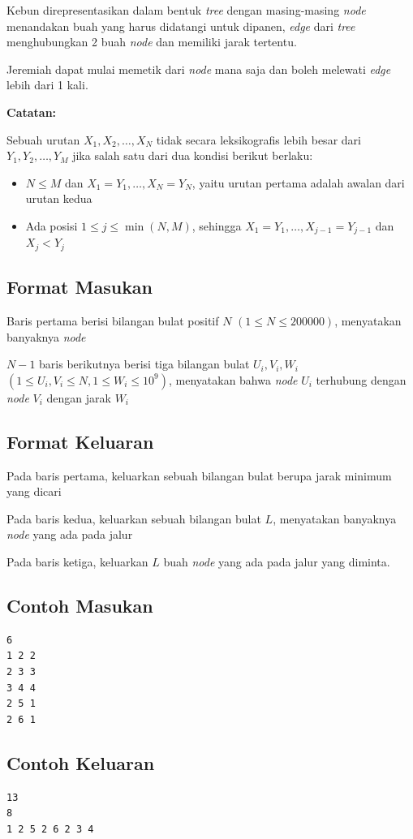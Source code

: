 \documentclass{article}
\begin{document}
Kebun direpresentasikan dalam bentuk \textit{tree} dengan masing-masing \textit{node} menandakan buah yang harus didatangi untuk dipanen, \textit{edge} dari \textit{tree} menghubungkan 2 buah \textit{node} dan memiliki jarak tertentu.

Jeremiah dapat mulai memetik dari \textit{node} mana saja dan boleh melewati \textit{edge} lebih dari 1 kali.

\textbf{Catatan:}

Sebuah urutan $X_1, X_2, \dots, X_N$ tidak secara leksikografis lebih besar dari $Y_1, Y_2, \dots, Y_M$ jika salah satu dari dua kondisi berikut berlaku:

\begin{itemize}
\item $N \leq M$ dan $X_1 = Y_1, \dots, X_N = Y_N$, yaitu urutan pertama adalah awalan dari urutan kedua

\item Ada posisi $1 \leq j \leq \min(N, M)$, sehingga $X_1 = Y_1, \dots, X_{j-1} = Y_{j-1}$ dan $X_j<Y_j$
\end{itemize}

\subsection*{Format Masukan}
Baris pertama berisi bilangan bulat positif $N$ $(1 \leq N \leq 200000)$, menyatakan banyaknya \textit{node}

$N-1$ baris berikutnya berisi tiga bilangan bulat $U_i, V_i, W_i$ $(1 \leq U_i, V_i \leq N, 1 \leq W_i \leq 10^9)$, menyatakan bahwa \textit{node} $U_i$ terhubung dengan \textit{node} $V_i$ dengan jarak $W_i$

\subsection*{Format Keluaran}
Pada baris pertama, keluarkan sebuah bilangan bulat berupa jarak minimum yang dicari

Pada baris kedua, keluarkan sebuah bilangan bulat $L$, menyatakan banyaknya \textit{node} yang ada pada jalur

Pada baris ketiga, keluarkan $L$ buah \textit{node} yang ada pada jalur yang diminta.

\begin{multicols}{2}
\subsection*{Contoh Masukan}
\begin{lstlisting}
6
1 2 2
2 3 3
3 4 4
2 5 1
2 6 1
\end{lstlisting}
\columnbreak
\subsection*{Contoh Keluaran}
\begin{lstlisting}
13
8
1 2 5 2 6 2 3 4
\end{lstlisting}
\vfill
\null
\end{multicols}
\end{document}
